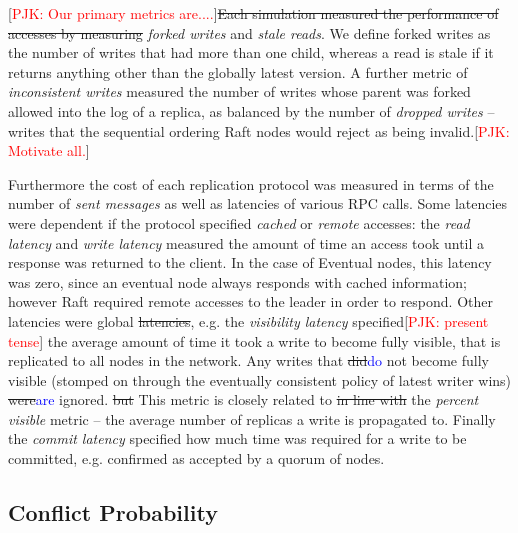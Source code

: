 \documentclass[10pt,conference,compsocconf,letterpaper]{IEEEtran}
\newcommand{\todo}[1]{{\textcolor{red}{#1}}}
\newcommand{\blue}[1]{{\textcolor{blue}{#1}}}
\newcommand{\pjk}[1]{[\todo{PJK: #1}]}
\begin{document}
\pjk{Our primary metrics are....}\st{Each simulation measured the performance of accesses by measuring} \textit{forked writes} and \textit{stale reads}. We define forked writes as the number of writes that had more than one child, whereas a read is stale if it returns anything other than the globally latest version. A further metric of \textit{inconsistent writes} measured the number of writes whose parent was forked allowed into the log of a replica, as balanced by the number of \textit{dropped writes} -- writes that the sequential ordering Raft nodes would reject as being invalid.\pjk{Motivate all.}

Furthermore the cost of each replication protocol was measured in terms of the number of \textit{sent messages} as well as latencies of various RPC calls. Some latencies were dependent if the protocol specified \textit{cached} or \textit{remote} accesses: the \textit{read latency} and \textit{write latency} measured the amount of time an access took until a response was returned to the client. In the case of Eventual nodes, this latency was zero, since an eventual node always responds with cached information; however Raft required remote accesses to the leader in order to respond. Other latencies were global \st{latencies}, e.g. the \textit{visibility latency} specified\pjk{present tense} the average amount of time it took a write to become fully visible, that is replicated to all nodes in the network. Any writes that \st{did}\blue{do} not become fully visible (stomped on through the eventually consistent policy of latest writer wins) \st{were}\blue{are} ignored.\st{ but} This metric is closely related to \st{in line with} the \textit{percent visible} metric -- the average number of replicas a write is propagated to. Finally the \textit{commit latency} specified how much time was required for a write to be committed, e.g. confirmed as accepted by a quorum of nodes.

\subsection{Conflict Probability}
\end{document}

